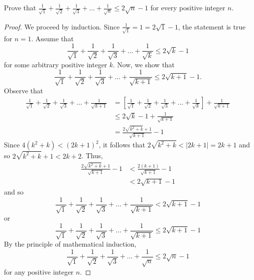 \documentclass[12pt]{article}
\newenvironment{problem}[2][Problem]{\begin{trivlist}
		\item[\hskip \labelsep {\bfseries #1}\hskip \labelsep {\bfseries #2.}]}{\end{trivlist}}
\begin{document}
\begin{problem}{15}
	Prove that $\frac{1}{\sqrt{1}}+\frac{1}{\sqrt{2}}+\frac{1}{\sqrt{3}}+\ldots+\frac{1}{\sqrt{n}}\leq 2\sqrt{n}-1$ for every positive integer $n$.
	\begin{proof}
		We proceed by induction. Since $\frac{1}{\sqrt{1}} = 1 = 2\sqrt{1}-1$, the statement is true for $n=1$. Assume that
		\begin{equation*} 
			\frac{1}{\sqrt{1}}+\frac{1}{\sqrt{2}}+\frac{1}{\sqrt{3}}+\ldots+\frac{1}{\sqrt{k}}\leq 2\sqrt{k}-1
		\end{equation*}
		for some arbitrary positive integer $k$. Now, we show that 
		\begin{equation*}
			\frac{1}{\sqrt{1}}+\frac{1}{\sqrt{2}}+\frac{1}{\sqrt{3}}+\ldots+\frac{1}{\sqrt{k+1}} \leq 2\sqrt{k+1}-1.
		\end{equation*}
	Observe that
	\begin{align*}
		\frac{1}{\sqrt{1}}+\frac{1}{\sqrt{2}}+\frac{1}{\sqrt{3}}+\ldots+\frac{1}{\sqrt{k+1}} &= \left[\frac{1}{\sqrt{1}}+\frac{1}{\sqrt{2}}+\frac{1}{\sqrt{3}}+\ldots+\frac{1}{\sqrt{k}}\right]+\frac{1}{\sqrt{k+1}}\\
		&\leq 2\sqrt{k}-1+\frac{1}{\sqrt{k+1}}\\
		&= \frac{2\sqrt{k^{2}+k}+1}{\sqrt{k+1}}-1
	\end{align*}
	Since $4(k^{2}+k)<(2k+1)^{2}$, it follows that $2\sqrt{k^{2}+k}<|2k+1| = 2k+1$ and so $2\sqrt{k^{2}+k}+1<2k+2$. Thus,
	\begin{align*}
		\frac{2\sqrt{k^{2}+k}+1}{\sqrt{k+1}}-1 &< \frac{2(k+1)}{\sqrt{k+1}}-1\\
		&< 2\sqrt{k+1}-1
	\end{align*}
	and so
	\begin{equation*}
		\frac{1}{\sqrt{1}}+\frac{1}{\sqrt{2}}+\frac{1}{\sqrt{3}}+\ldots+\frac{1}{\sqrt{k+1}} < 2\sqrt{k+1}-1
	\end{equation*}
or
\begin{equation*}
	\frac{1}{\sqrt{1}}+\frac{1}{\sqrt{2}}+\frac{1}{\sqrt{3}}+\ldots+\frac{1}{\sqrt{k+1}} \leq 2\sqrt{k+1}-1
\end{equation*}
By the principle of mathematical induction, 
\begin{equation*}
	\frac{1}{\sqrt{1}}+\frac{1}{\sqrt{2}}+\frac{1}{\sqrt{3}}+\ldots+\frac{1}{\sqrt{n}} \leq 2\sqrt{n}-1
\end{equation*}
for any positive integer $n$.
	\end{proof} 
\end{problem}
\end{document}
